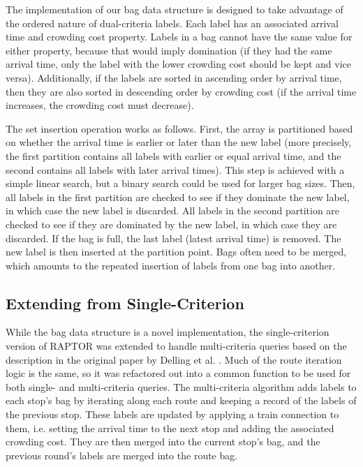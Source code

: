 
The implementation of our bag data structure is designed to take advantage of the ordered nature of dual-criteria labels. Each label has an associated arrival time and crowding cost property. Labels in a bag cannot have the same value for either property, because that would imply domination (if they had the same arrival time, only the label with the lower crowding cost should be kept and vice versa). Additionally, if the labels are sorted in ascending order by arrival time, then they are also sorted in descending order by crowding cost (if the arrival time increases, the crowding cost must decrease). 

The set insertion operation works as follows. First, the array is partitioned based on whether the arrival time is earlier or later than the new label (more precisely, the first partition contains all labels with earlier or equal arrival time, and the second contains all labels with later arrival times). This step is achieved with a simple linear search, but a binary search could be used for larger bag sizes. Then, all labels in the first partition are checked to see if they dominate the new label, in which case the new label is discarded. All labels in the second partition are checked to see if they are dominated by the new label, in which case they are discarded. If the bag is full, the last label (latest arrival time) is removed. The new label is then inserted at the partition point. Bags often need to be merged, which amounts to the repeated insertion of labels from one bag into another.

\subsection{Extending from Single-Criterion}
While the bag data structure is a novel implementation, the single-criterion version of RAPTOR was extended to handle multi-criteria queries based on the description in the original paper by Delling et al. \cite{dellingRoundBasedPublicTransit2012}. Much of the route iteration logic is the same, so it was refactored out into a common function to be used for both single- and multi-criteria queries. The multi-criteria algorithm adds labels to each stop's bag by iterating along each route and keeping a record of the labels of the previous stop. These labels are updated by applying a train connection to them, i.e. setting the arrival time to the next stop and adding the associated crowding cost. They are then merged into the current stop's bag, and the previous round's labels are merged into the route bag.

